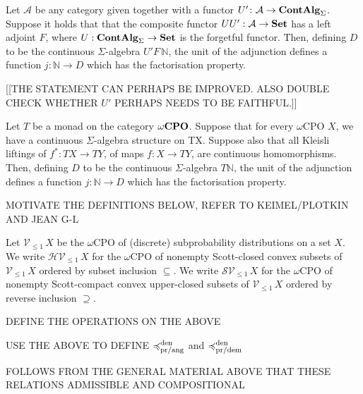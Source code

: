 \begin{lemma}
Let $\mathcal{A}$ be any category given together with a functor $U' \colon \mathcal{A} \to \mathbf{ContAlg}_\Sigma$.
Suppose it holds that that the
composite functor $UU' : \mathcal{A} \to \mathbf{Set}$ has a left adjoint $F$, where $U: \mathbf{ContAlg}_\Sigma \to \mathbf{Set}$ is the forgetful functor.
Then, defining $D$ to be the continuous $\Sigma$-algebra $U' F \, \mathbb{N}$, the unit of the adjunction defines a function
$j \colon \mathbb{N} \to D$ which has the factorisation property.
\end{lemma}

[[THE STATEMENT CAN PERHAPS BE IMPROVED. ALSO DOUBLE CHECK WHETHER $U'$ PERHAPS NEEDS TO BE FAITHFUL.]]


\begin{lemma}
Let $T$ be a monad on the category $\mathbf{{\omega}CPO}$.  Suppose that for every $\omega$CPO $X$, we have a 
continuous $\Sigma$-algebra structure on TX. Suppose also that all Kleisli liftings of 
$f^* \colon TX \to TY$, of maps $f \colon X \to TY$, are  continuous  homomorphisms. Then,
defining $D$ to be the continuous $\Sigma$-algebra $T \mathbb{N}$, the unit of the adjunction defines a function
$j \colon \mathbb{N} \to D$ which has the factorisation property.
\end{lemma}

MOTIVATE THE DEFINITIONS BELOW, REFER TO KEIMEL/PLOTKIN AND JEAN G-L

Let $\mathcal{V}_{\leq 1} \,X$ be the $\omega$CPO of (discrete) subprobability distributions on a set $X$.
We write $\mathcal{H}\mathcal{V}_{\leq 1} \,X$ for the $\omega$CPO of nonempty Scott-closed convex subsets
of  $\mathcal{V}_{\leq 1} \,X$  ordered by subset inclusion $\subseteq$. 
We write $\mathcal{S}\mathcal{V}_{\leq 1} \,X$ for the $\omega$CPO of nonempty Scott-compact convex upper-closed subsets
of  $\mathcal{V}_{\leq 1} \,X$  ordered by reverse inclusion $\supseteq$.

DEFINE THE OPERATIONS ON THE ABOVE

USE THE ABOVE TO DEFINE $\preccurlyeq^{\text{den}}_{\text{pr/ang}}$ and $\preccurlyeq^{\text{den}}_{\text{pr/dem}}$

FOLLOWS FROM THE GENERAL MATERIAL ABOVE THAT THESE RELATIONS ADMISSIBLE AND COMPOSITIONAL


